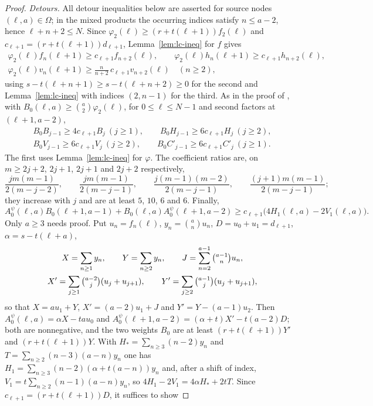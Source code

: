 \begin{proof}
\emph{Detours.} All detour inequalities below are asserted for source nodes $(\ell,a)\in\Omega$; in the mixed products the occurring indices satisfy $n\leq a-2$, hence $\ell+n+2\leq N$. Since $\varphi_2(\ell)\geq(r+t(\ell+1))f_2(\ell)$ and $c_{\ell+1}=(r+t(\ell+1))d_{\ell+1}$, Lemma~\ref{lem:lc-ineq} for $f$ gives
\[
\begin{gathered}
\varphi_2(\ell)f_n(\ell+1)\geq c_{\ell+1}f_{n+2}(\ell),\qquad\varphi_2(\ell)h_n(\ell+1)\geq c_{\ell+1}h_{n+2}(\ell),\\
\varphi_2(\ell)v_n(\ell+1)\geq\tfrac{n}{n+2}\,c_{\ell+1}v_{n+2}(\ell)\quad(n\geq2),
\end{gathered}
\]
using $s-t(\ell+n+1)\geq s-t(\ell+n+2)\geq0$ for the second and Lemma~\ref{lem:lc-ineq} with indices $(2,n-1)$ for the third. As in the proof of \cite[Lemma~]{P1}, with $B_0(\ell,a)\geq\binom a2\varphi_2(\ell)$, for $0\leq\ell\leq N-1$ and second factors at $(\ell+1,a-2)$,
\[
\begin{gathered}
B_0B_{j-1}\geq4c_{\ell+1}B_j\ (j\geq1),\qquad B_0H_{j-1}\geq6c_{\ell+1}H_j\ (j\geq2),\\
B_0V_{j-1}\geq6c_{\ell+1}V_j\ (j\geq2),\qquad B_0C'_{j-1}\geq6c_{\ell+1}C'_j\ (j\geq1).
\end{gathered}
\]
The first uses Lemma~\ref{lem:lc-ineq} for $\varphi$. The coefficient ratios are, on $m\geq2j+2$, $2j+1$, $2j+1$ and $2j+2$ respectively,
\[
\frac{jm(m-1)}{2(m-j-2)},\qquad\frac{jm(m-1)}{2(m-j-1)},\qquad\frac{j(m-1)(m-2)}{2(m-j-1)},\qquad\frac{(j+1)m(m-1)}{2(m-j-1)};
\]
they increase with $j$ and are at least $5$, $10$, $6$ and $6$. Finally,
\begin{equation}\label{eq:affine-key}
A^\psi_0(\ell,a)B_0(\ell+1,a-1)+B_0(\ell,a)A^\psi_0(\ell+1,a-2)\geq c_{\ell+1}\bigl(4H_1(\ell,a)-2V_1(\ell,a)\bigr).
\end{equation}
Only $a\geq3$ needs proof. Put $u_n=f_n(\ell)$, $y_n=\binom anu_n$, $D=u_0+u_1=d_{\ell+1}$, $\alpha=s-t(\ell+a)$,
\[
\begin{gathered}
X=\sum_{n\geq1}y_n,\qquad Y=\sum_{n\geq2}y_n,\qquad J=\sum_{n=2}^{a-1}\tbinom{a-1}nu_n,\\
X'=\sum_{j\geq1}\tbinom{a-2}j(u_j+u_{j+1}),\qquad Y'=\sum_{j\geq2}\tbinom{a-1}j(u_j+u_{j+1}),
\end{gathered}
\]
so that $X=au_1+Y$, $X'=(a-2)u_1+J$ and $Y'=Y-(a-1)u_2$. Then $A^\psi_0(\ell,a)=\alpha X-tau_0$ and $A^\psi_0(\ell+1,a-2)=(\alpha+t)X'-t(a-2)D$; both are nonnegative, and the two weights $B_0$ are at least $(r+t(\ell+1))Y'$ and $(r+t(\ell+1))Y$. With $H_*=\sum_{n\geq3}(n-2)y_n$ and $T=\sum_{n\geq2}(n-3)(a-n)y_n$ one has $H_1=\sum_{n\geq3}(n-2)(\alpha+t(a-n))y_n$ and, after a shift of index, $V_1=t\sum_{n\geq2}(n-1)(a-n)y_n$, so $4H_1-2V_1=4\alpha H_*+2tT$. Since $c_{\ell+1}=(r+t(\ell+1))D$, it suffices to show

\end{proof}
